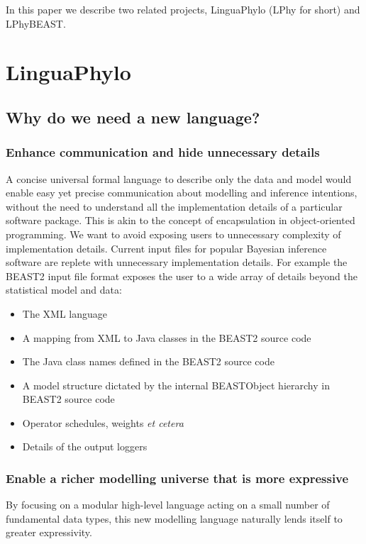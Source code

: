 \documentclass[oneside]{article}
\begin{document}
In this paper we describe two related projects, LinguaPhylo (LPhy for
short) and LPhyBEAST.  

\section{LinguaPhylo}

\subsection{Why do we need a new language?}


\subsubsection{Enhance communication and hide unnecessary details}

A concise universal formal language to describe only the data and model would enable easy yet precise communication about modelling and inference intentions, without the need to understand all the implementation details of a particular software package. This is akin to the concept of encapsulation in object-oriented programming. We want to avoid exposing users to unnecessary complexity of implementation details. 
Current input files for popular Bayesian inference software are replete with unnecessary implementation details.
For example the BEAST2 input file format exposes the user to a wide array of details beyond the statistical model and data:
\begin{itemize}
\item The XML language
\item A mapping from XML to Java classes in the BEAST2 source code
\item The Java class names defined in the BEAST2 source code
\item A model structure dictated by the internal BEASTObject hierarchy in BEAST2 source code
\item Operator schedules, weights {\it et cetera}
\item Details of the output loggers
\end{itemize}

\subsubsection{Enable a richer modelling universe that is more expressive}

By focusing on a modular high-level language acting on a small number of fundamental data types, this new modelling language naturally lends itself to greater expressivity.
\end{document}
